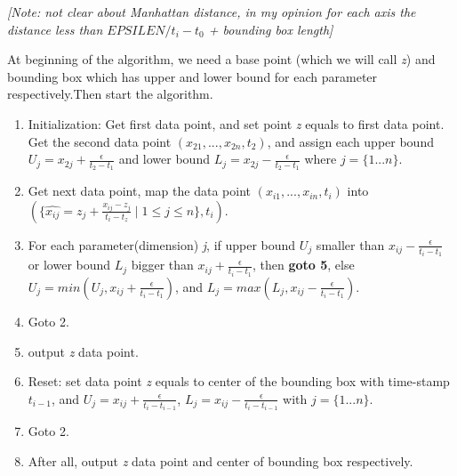 \documentclass[10pt, conference, compsocconf]{IEEEtran}
\newcommand{\note}[1]{
  \color{blue}\emph{[Note: #1]}
  \color{black}
}
\begin{document}
\note{not clear about Manhattan distance, in my opinion for each axis the distance less than $EPSILEN/t_i-t_0$ + bounding box length}

At beginning of the algorithm, we need a base point (which we will call \textit{z}) and bounding box which has upper and lower bound for each parameter respectively.Then start the algorithm.
\begin{enumerate}
  \item Initialization: Get first data point, and set point \textit{z} equals to first data point. Get the second data point $(x_{21},...,x_{2n},t_2)$, and assign each upper bound $U_j = x_{2j}+\frac{\epsilon}{t_2-t_1}$ and lower bound $L_j = x_{2j}-\frac{\epsilon}{t_2-t_1}$ where $j=\{1...n\}$.
  \item Get next data point, map the data point $(x_{i1},...,x_{in},t_i)$ into $(\{\hat{x_{ij}}=z_j + \frac{x_{ij}-z_{j}}{t_i-t_z} \mid1\leqslant{j}\leqslant{n}\},t_i)$.
  \item For each parameter(dimension) \textit{j}, if upper bound $U_j$ smaller than $x_{ij}-\frac{\epsilon}{t_i-t_1}$ or lower bound $L_j$ bigger than $x_{ij}+\frac{\epsilon}{t_i-t_1}$, then \textbf{goto 5}, else $U_j = min(U_j, x_{ij}+\frac{\epsilon}{t_i-t_1})$, and $L_j = max(L_j, x_{ij}-\frac{\epsilon}{t_i-t_1})$.
  \item Goto 2.
  \item output \textit{z} data point.
  \item Reset: set data point \textit{z} equals to center of the bounding box with time-stamp $t_{i-1}$, and $U_j=x_{ij}+\frac{\epsilon}{t_i-t_{i-1}}$, $L_j =x_{ij}-\frac{\epsilon}{t_i-t_{i-1}}$ with $j=\{1...n\}$.
  \item Goto 2.
  \item After all, output \textit{z} data point and center of bounding box respectively.
\end{enumerate}
\end{document}
